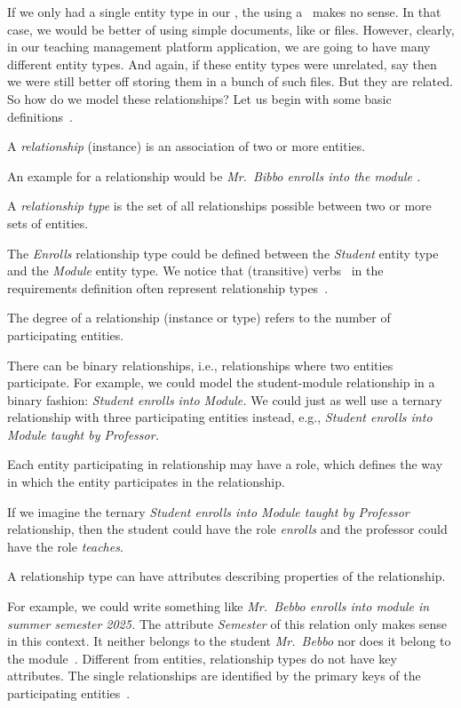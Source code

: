 %
%
%
If we only had a single entity type in our \db, the using a \db\ makes no sense.
In that case, we would be better of using simple documents, like  or  files.
However, clearly, in our teaching management platform application, we are going to have many different entity types.
And again, if these entity types were unrelated, say    then we were still better off storing them in a bunch of such files.
But they are related.
So how do we model these relationships?
Let us begin with some basic definitions~\cite{G2011EW2ITDS:CMUTERM}.%
%
\begin{definition}[Relationship]%
A \emph{relationship} (instance) is an association of two or more entities.%
\end{definition}%
%
An example for a relationship would be \emph{Mr.~Bibbo enrolls into the module .}
%
\begin{definition}%
A \emph{relationship type} is the set of all relationships possible between two or more sets of entities.%
\end{definition}%
%
The \emph{Enrolls} relationship type could be defined between the \emph{Student} entity type and the \emph{Module} entity type.
We notice that (transitive) verbs~\cite{EOWM2025MWAMTD:TA} in the requirements definition often represent relationship types~\cite{C1997ECAED}.%
%
\begin{definition}%
The degree of a relationship (instance or type) refers to the number of participating entities.%
\end{definition}%
%
There can be binary relationships, i.e., relationships where two entities participate.
For example, we could model the student-module relationship in a binary fashion: \emph{Student enrolls into Module.}
We could just as well use a ternary relationship with three participating entities instead, e.g., \emph{Student enrolls into Module taught by Professor.}
%
\begin{definition}%
Each entity participating in relationship may have a role, which defines the way in which the entity participates in the relationship.%
\end{definition}%
%
If we imagine the ternary \emph{Student enrolls into Module taught by Professor} relationship, then the student could have the role \emph{enrolls} and the professor could have the role \emph{teaches}.%
%
\begin{definition}%
A relationship type can have attributes describing properties of the relationship.%
\end{definition}%
%
For example, we could write something like \emph{Mr.~Bebbo enrolls into module  in summer semester 2025.}
The attribute \emph{Semester} of this relation only makes sense in this context.
It neither belongs to the student \emph{Mr.~Bebbo} nor does it belong to the module~.
Different from entities, relationship types do not have key attributes.
The single relationships are identified by the primary keys of the participating entities~\cite{G2011EW2ITDS:CMUTERM}.

